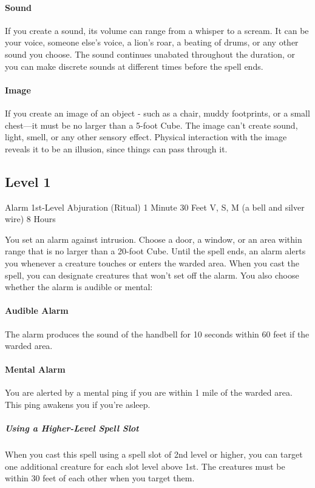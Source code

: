 \documentclass[letterpaper,openany,oneside,twocolumn]{book}
\begin{document}
\paragraph*{Sound} If you create a sound, its volume can range from a whisper to a scream. It can be your voice, someone else's voice, a lion's roar, a beating of drums, or any other sound you choose. The sound continues unabated throughout the duration, or you can make discrete sounds at different times before the spell ends.

\paragraph*{Image} If you create an image of an object - such as a chair, muddy footprints, or a small chest—it must be no larger than a 5-foot Cube. The image can't create sound, light, smell, or any other sensory effect. Physical interaction with the image reveals it to be an illusion, since things can pass through it.

\subsection*{Level 1}

\DndSpellHeader
  {Alarm}
  {1st-Level Abjuration (Ritual)}
  {1 Minute}
  {30 Feet}
  {V, S, M (a bell and silver wire)}
  {8 Hours}

You set an alarm against intrusion. Choose a door, a window, or an area within range that is no larger than a 20-foot Cube. Until the spell ends, an alarm alerts you whenever a creature touches or enters the warded area. When you cast the spell, you can designate creatures that won't set off the alarm. You also choose whether the alarm is audible or mental:
\paragraph*{Audible Alarm} The alarm produces the sound of the handbell for 10 seconds within 60 feet if the warded area.
\paragraph*{Mental Alarm} You are alerted by a mental ping if you are within 1 mile of the warded area. This ping awakens you if you're asleep.

\subparagraph*{Using a Higher-Level Spell Slot} When you cast this spell using a spell slot of 2nd level or higher, you can target one additional creature for each slot level above 1st. The creatures must be within 30 feet of each other when you target them.
\end{document}
